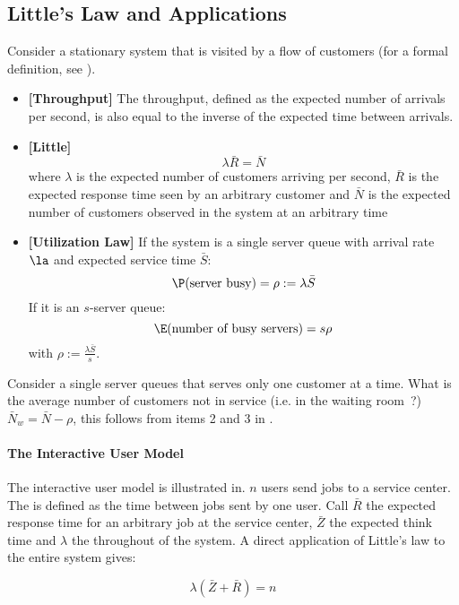 \subsection{Little's Law and Applications}

\begin{shadethm}
 Consider a stationary system
that is visited by a flow of customers (for a
formal
 definition, see ).
\begin{itemize}
  \item \textbf{[Throughput]} The throughput, defined as the expected
  number of arrivals per second, is also equal to the inverse
  of the expected time between arrivals.
  \item \textbf{[Little]} $$\lambda \bar{R}=\bar{N}$$ where $\lambda$
  is the
  expected number of customers arriving per second, $\bar{R}$ is the
  expected response time seen by an arbitrary customer and
  $\bar{N}$ is the expected number of customers observed in the
  system at an arbitrary time
  \item \textbf{[Utilization Law]} If the system is a single server
  queue with arrival rate $\la$ and expected service time $\bar{S}$:
  $$\P(\mbox{server busy})=\rho:=\lambda \bar{S}$$
  If it is an $s$-server queue:
  $$\E(\mbox{number of busy
  servers})=s \rho$$ with $\rho:=\frac{\lambda \bar{S}}{s}$.
\end{itemize}
\end{shadethm} %

 {Consider a single server queues that serves only one customer at a time. What is
 the average number of customers not in service (i.e. in the waiting room~?)}
 {$\bar{N}_w=\bar{N}-\rho$, this follows from items 2 and 3 in .}

\paragraph{The Interactive User Model}
The interactive user model is illustrated
in. $n$ users send jobs to a
service center. The  is defined as
the time between jobs sent by one user. Call
$\bar{R}$ the expected response time for an
arbitrary job at the service center, $\bar{Z}$
the expected think time and $\lambda$ the
throughout of the system. A direct application of
 Little's law to the entire system gives:
\begin{shadethm}
$$\lambda(\bar{Z}+ \bar{R})=n
$$
\end{shadethm}
\begin{figure}[!htbp]
\end{figure}

